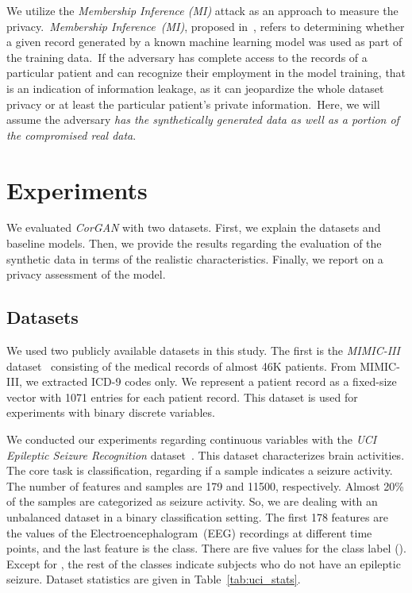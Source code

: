 \documentclass[letterpaper]{article} \usepackage{aaai20}  \usepackage{times}  \usepackage{helvet} \usepackage{courier}  \usepackage[hyphens]{url}  \usepackage{graphicx} \urlstyle{rm} \def\UrlFont{\rm}  \usepackage{graphicx}  \frenchspacing  \setlength{\pdfpagewidth}{8.5in}  \setlength{\pdfpageheight}{11in}
\begin{document}
We utilize the \textit{Membership Inference (MI)} attack as an approach to measure the privacy.~\textit{Membership Inference~(MI)}, proposed in~\cite{shokri2017membership}, refers to determining whether a given record generated by a known machine learning model was used as part of the training data.~If the adversary has complete access to the records of a particular patient and can recognize their employment in the model training, that is an indication of information leakage, as it can jeopardize the whole dataset privacy or at least the particular patient's private information.~Here, we will assume the adversary \textit{has the synthetically generated data as well as a portion of the compromised real data}.






\section{Experiments}\label{sec:Experiments}

We evaluated \textit{CorGAN} with two datasets.
First, we explain the datasets and baseline models.
Then, we provide the results regarding the evaluation of the synthetic data in terms of the realistic characteristics. 
Finally, we report on a privacy assessment of the model.

\subsection{Datasets}\label{sec:Experimentssub:Dataset}


We used two publicly available datasets in this study.
The first is the \textit{MIMIC-III} dataset~\cite{johnson2016mimic} consisting of the medical records of almost 46K patients.
From MIMIC-III, we extracted ICD-9 codes only.
We represent a patient record as a fixed-size vector with 1071 entries for each patient record.
This dataset is used for experiments with binary discrete variables.

We conducted our experiments regarding continuous variables with the \textit{UCI Epileptic Seizure Recognition} dataset~\cite{andrzejak2001indications}.
This dataset characterizes brain activities.
The core task is classification, regarding if a sample indicates a seizure activity.
The number of features and samples are 179 and 11500, respectively.
Almost 20\% of the samples are categorized as seizure activity.
So, we are dealing with an unbalanced dataset in a binary classification setting.
The first 178 features are the values of the Electroencephalogram~(EEG) recordings at different time points, and the last feature is the class.
There are five values for the class label ().
Except for , the rest of the classes indicate subjects who do not have an epileptic seizure.
Dataset statistics are given in Table~\ref{tab:uci_stats}.
\end{document}
